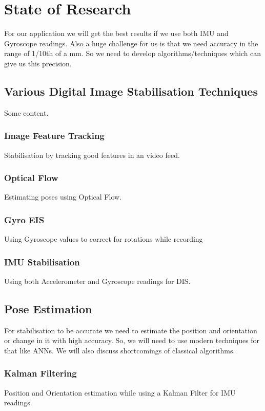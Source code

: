 \chapter{State of Research} \label{chapter_three}

For our application we will get the best results if we use both IMU and Gyroscope readings. 
Also a huge challenge for us is that we need accuracy in the range of 1/10th of a mm. So we need to develop algorithms/techniques which can give us this precision.

\section{Various Digital Image Stabilisation Techniques}

Some content.
\subsection{Image Feature Tracking}
Stabilisation by tracking good features in an video feed.

\subsection{Optical Flow}
Estimating poses using Optical Flow.

\subsection{Gyro EIS}
Using Gyroscope values to correct for rotations while recording

\subsection{IMU Stabilisation}
Using both Accelerometer and Gyroscope readings for DIS.

\section{Pose Estimation}
\label{sec:sota_pose_est}
For stabilisation to be accurate we need to estimate the position and orientation or change in it with high accuracy. So, we will need to use modern techniques for that like ANNs. We will also discuss shortcomings of classical algorithms.

\subsection{Kalman Filtering}
Position and Orientation estimation while using a Kalman Filter for IMU readings.

